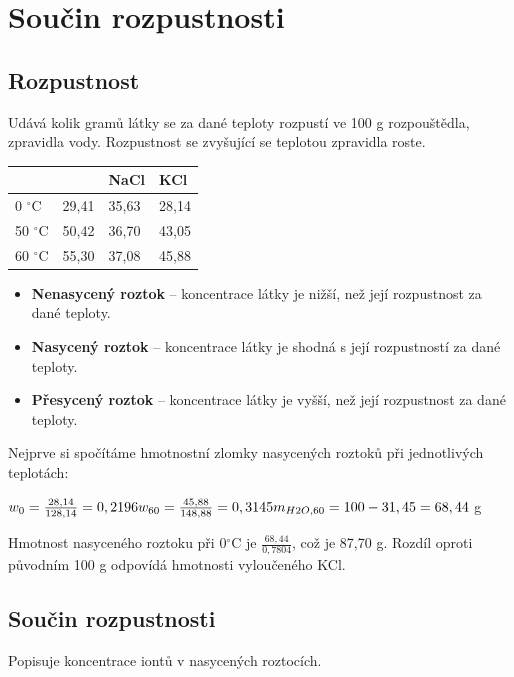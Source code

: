 \section{Součin rozpustnosti}

\subsection{Rozpustnost}
Udává kolik gramů látky se za dané teploty rozpustí ve 100 g rozpouštědla, zpravidla vody. Rozpustnost se zvyšující se teplotou zpravidla roste.

\begin{tabular}{|l|l|l|l|}
	\hline
	& \ce{NH4Cl} & NaCl & KCl \\\hline
	0 $^\circ$C & 29,41 & 35,63 & 28,14 \\\hline
	50 $^\circ$C & 50,42 & 36,70 & 43,05 \\\hline
	60 $^\circ$C & 55,30 & 37,08 & 45,88 \\\hline
\end{tabular}

\begin{itemize}
	\item \textbf{Nenasycený roztok} -- koncentrace látky je nižší, než její rozpustnost za dané teploty.
	\item \textbf{Nasycený roztok} -- koncentrace látky je shodná s její rozpustností za dané teploty.
	\item \textbf{Přesycený roztok} -- koncentrace látky je vyšší, než její rozpustnost za dané teploty.
\end{itemize}


Nejprve si spočítáme hmotnostní zlomky nasycených roztoků při jednotlivých teplotách:

$w_0 = \frac{28,14}{128,14} = 0,2196\\
w_{60} = \frac{45,88}{148,88} = 0,3145\\
m_{H2O,60} = 100 - 31,45 = 68,44$ g 

Hmotnost nasyceného roztoku při 0$^\circ$C je $\frac{68,44}{0,7804}$, což je 87,70 g. Rozdíl oproti původním 100 g odpovídá hmotnosti vyloučeného KCl.


\subsection{Součin rozpustnosti}
Popisuje koncentrace iontů v nasycených roztocích.

